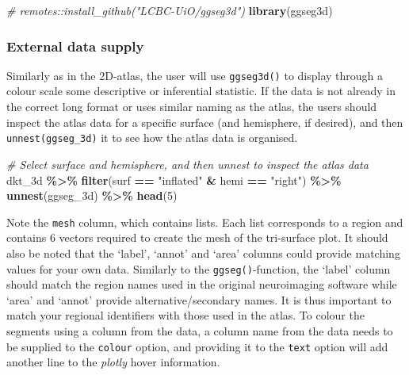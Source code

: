 \documentclass[fleqn,10pt]{wlpeerj} %
\newenvironment{Shaded}{\begin{snugshade}}{\end{snugshade}}
\newcommand{\CommentTok}[1]{\textcolor[rgb]{0.56,0.35,0.01}{\textit{#1}}}
\newcommand{\DecValTok}[1]{\textcolor[rgb]{0.00,0.00,0.81}{#1}}
\newcommand{\KeywordTok}[1]{\textcolor[rgb]{0.13,0.29,0.53}{\textbf{#1}}}
\newcommand{\NormalTok}[1]{#1}
\newcommand{\OperatorTok}[1]{\textcolor[rgb]{0.81,0.36,0.00}{\textbf{#1}}}
\newcommand{\StringTok}[1]{\textcolor[rgb]{0.31,0.60,0.02}{#1}}
\begin{document}
\small

\begin{Shaded}
\begin{Highlighting}[]
\CommentTok{\# remotes::install\_github("LCBC{-}UiO/ggseg3d")}
\KeywordTok{library}\NormalTok{(ggseg3d)}
\end{Highlighting}
\end{Shaded}

\normalsize

\hypertarget{external-data-supply}{%
\subsubsection{External data supply}\label{external-data-supply}}

Similarly as in the 2D-atlas, the user will use \texttt{ggseg3d()} to display through a colour scale some descriptive or inferential statistic.
If the data is not already in the correct long format or uses similar naming as the atlas, the users should inspect the atlas data for a specific surface (and hemisphere, if desired), and then \texttt{unnest(ggseg\_3d)} it to see how the atlas data is organised.

\small

\begin{Shaded}
\begin{Highlighting}[]
\CommentTok{\# Select surface and hemisphere, and then unnest to inspect the atlas data}
\NormalTok{dkt\_3d }\OperatorTok{\%>\%}
\StringTok{  }\KeywordTok{filter}\NormalTok{(surf }\OperatorTok{==}\StringTok{ "inflated"} \OperatorTok{\&}\StringTok{ }\NormalTok{hemi }\OperatorTok{==}\StringTok{ "right"}\NormalTok{) }\OperatorTok{\%>\%}
\StringTok{  }\KeywordTok{unnest}\NormalTok{(ggseg\_3d) }\OperatorTok{\%>\%}
\StringTok{  }\KeywordTok{head}\NormalTok{(}\DecValTok{5}\NormalTok{)}
\end{Highlighting}
\end{Shaded}

\normalsize

Note the \texttt{mesh} column, which contains lists.
Each list corresponds to a region and contains 6 vectors required to create the mesh of the tri-surface plot.
It should also be noted that the `label', `annot' and `area' columns could provide matching values for your own data.
Similarly to the \texttt{ggseg()}-function, the `label' column should match the region names used in the original neuroimaging software while `area' and `annot' provide alternative/secondary names.
It is thus important to match your regional identifiers with those used in the atlas.
To colour the segments using a column from the data, a column name from the data needs to be supplied to the \texttt{colour} option, and providing it to the \texttt{text} option will add another line to the \emph{plotly} hover information.
\end{document}
